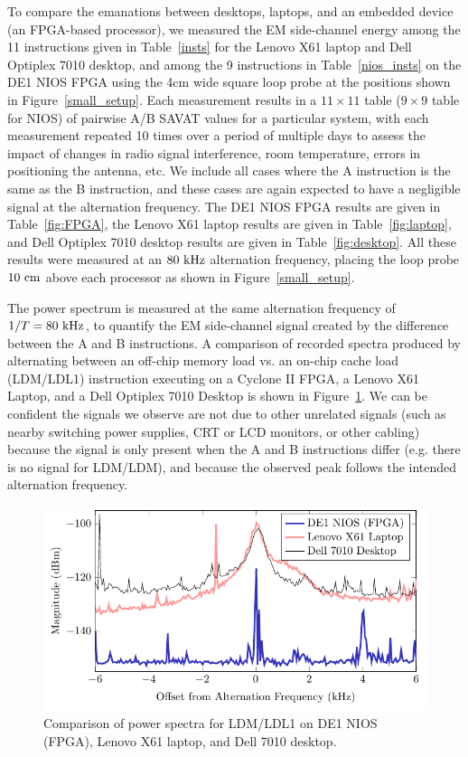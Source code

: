 To compare the emanations between desktops, laptops, and an embedded device (an FPGA-based processor), we measured the EM side-channel energy among the 11 instructions given in Table~\ref{insts} for the Lenovo X61 laptop and Dell Optiplex 7010 desktop, and among the 9 instructions in Table~\ref{nios_insts} on the DE1 NIOS FPGA using the 4cm wide square loop probe at the positions shown in Figure~\ref{small_setup}. Each measurement results in a $11 \times 11$ table ($9 \times 9$ table for NIOS) of pairwise A/B SAVAT values for a particular system, with each measurement repeated 10 times over a period of multiple days to assess the impact of changes in radio signal interference, room temperature, errors in positioning the antenna, etc. We include all cases where the A instruction is the same as the B instruction, and these cases are again expected to have a negligible signal at the alternation frequency. The DE1 NIOS FPGA results are given in Table~\ref{fig:FPGA}, the Lenovo X61 laptop results are given in Table~\ref{fig:laptop}, and Dell Optiplex 7010 desktop results are given in Table~\ref{fig:desktop}. All these results were measured at an $80~{\rm kHz}$ alternation frequency, placing the loop probe $10~{\rm cm}$ above each processor as shown in Figure~\ref{small_setup}. 

The power spectrum is measured at the same alternation frequency of $1/T=80~{\rm kHz}$, to quantify the EM side-channel signal created by the difference between the A and B instructions. A comparison of recorded spectra produced by alternating between an off-chip memory load vs. an on-chip cache load (LDM/LDL1) instruction executing on a Cyclone II FPGA, a Lenovo X61 Laptop, and a Dell Optiplex 7010 Desktop is shown in Figure~\ref{LDM-LDL1-Spectrum}. We can be confident the signals we observe are not due to other unrelated signals (such as nearby switching power supplies, CRT or LCD monitors, or other cabling) because the signal is only present when the A and B instructions differ (e.g. there is no signal for LDM/LDM), and because the observed peak follows the intended alternation frequency. 
\begin{figure}[htb]
\centering
\includegraphics[width=5in]{../emc_comparison_4/spect_cmp.pdf}
\caption{Comparison of power spectra for LDM/LDL1 on DE1 NIOS (FPGA), Lenovo X61 laptop, and Dell 7010 desktop.}
\label{LDM-LDL1-Spectrum}
\end{figure}

